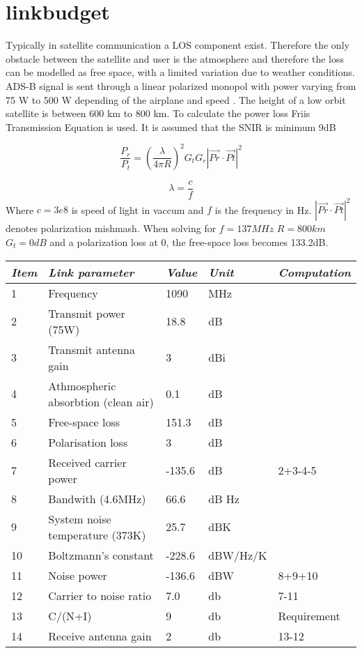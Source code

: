 \chapter{linkbudget}\label{ch:linkbudget}

Typically in satellite communication a LOS component exist. Therefore the only obstacle between the satellite and user is the atmosphere and therefore the loss can be modelled as free space, with a limited variation due to weather conditions. ADS-B signal is sent through a linear polarized monopol with power varying from 75 W to 500 W depending of the airplane and speed \citep{FlyingLab}. The height of a low orbit satellite is between 600 km to 800 km. To calculate the power loss Friis Transmission Equation is used. It is assumed that the SNIR is minimum 9dB \citep{itu} 

\begin{equation}
\frac{P_r}{P_t} = (\frac{\lambda}{4\pi R})^2 G_t G_r|\vec{Pr}\cdot \vec{Pt}|^2
\end{equation}

\begin{equation}
\lambda = \frac{c}{f}
\end{equation}
Where $c = 3e8$ is speed of light in vaccum and $ f$ is the frequency in Hz. $|\vec{Pr}\cdot \vec{Pt}|^2$ denotes polarization mishmash. When solving for $f = 137MHz$ $R=800km$  $G_t = 0 dB$ and a polarization loss at 0, the free-space loss becomes 133.2dB.


\begin{center}
  \begin{tabular}{ l  l  l  l  l}
    \hline
   \textit{Item} & \textit{Link parameter} & \textit{Value} & \textit{Unit} & \textit{Computation} \\ \hline
    1 & Frequency	& 1090 & MHz & \\ \hline
    2 & Transmit power (75W) & 18.8 & dB & \\ \hline
    3 & Transmit antenna gain & 3 & dBi & \\ \hline
    4 & Athmospheric absorbtion (clean air) & 0.1 & dB & \\ \hline
    5 & Free-space loss & 151.3 & dB & \\ \hline
    6 & Polarisation loss & 3 & dB & \\ \hline
    7 & Received carrier power & -135.6 & dB & 2+3-4-5\\ \hline
    8 & Bandwith (4.6MHz) & 66.6 & dB Hz & \\ \hline 
    9 & System noise temperature (373K) & 25.7 & dBK& \\ \hline 
    10 & Boltzmann's constant & -228.6 & dBW/Hz/K& \\ \hline 
    11 & Noise power & -136.6 & dBW& 8+9+10\\ \hline 
    12 & Carrier to noise ratio & 7.0 & db & 7-11\\ \hline 
    13 & C/(N+I) & 9 & db & Requirement\\ \hline
    14 & Receive antenna gain & 2 & db & 13-12\\ \hline
  \end{tabular}
\end{center}

